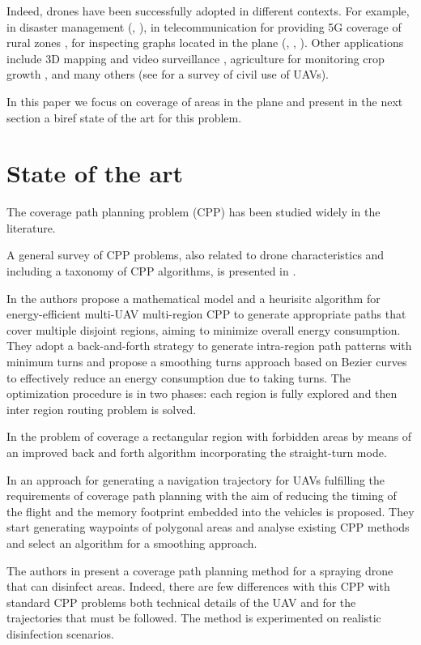 \documentclass[12pt]{elsarticle}
\begin{document}
Indeed, drones have been successfully adopted in different contexts. For example, in disaster management (\cite{art:Chiaraviglio19}, \cite{art:shi2024}), in telecommunication for providing 5G coverage of rural zones \cite{art:Amorosi19}, for inspecting graphs located in the plane  (\cite{art:Amorosi2024}, \cite{art:Amorosi2021}, \cite{art:Amorosi2023}). Other applications include 3D mapping and video surveillance \cite{art:Nexand14}, agriculture for monitoring crop growth \cite{art:Tokekaretal16}, and many others (see \cite{art:Otto18} for a survey of civil use of UAVs). 

In this paper we focus on coverage of areas in the plane and present in the next section a biref state of the art for this problem.


\section{State of the art}
The coverage path planning problem (CPP) has been studied widely in the literature.

A general survey of CPP problems, also related to drone characteristics and including a taxonomy of CPP algorithms, is presented in \cite{Sonawane2023}.


In \cite{Ahmed2024} the authors propose a mathematical model and a heurisitc algorithm  for energy-efficient multi-UAV multi-region CPP to generate appropriate paths that cover multiple disjoint regions, aiming to minimize overall energy consumption. They adopt  a back-and-forth strategy to generate intra-region path patterns with minimum turns and propose a smoothing turns approach  based on Bezier curves to effectively reduce an energy consumption due to taking turns.  The optimization procedure is in two phases: each region is fully explored and then inter region routing problem is solved.

In \cite{Mu2023} the problem of coverage a rectangular region with forbidden areas by means of an improved back and forth algorithm incorporating  the straight-turn mode.


In \cite{Tripipicchio2023} an approach for generating a navigation trajectory for UAVs fulfilling the requirements of coverage path planning  with the aim of reducing the timing of the flight and the memory footprint embedded into the vehicles is proposed. They start generating waypoints of polygonal areas and analyse existing CPP methods and select an algorithm for a smoothing approach. 


The authors in \cite{art:VAZQUEZ} present a coverage path planning method for a spraying drone that can disinfect areas. Indeed, there are few differences with this CPP with standard CPP problems both technical details of the UAV and for the trajectories that must be followed. The method is experimented on realistic disinfection scenarios.
 
\end{document}
